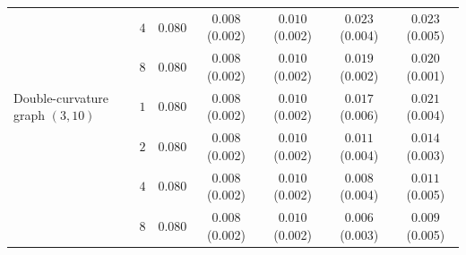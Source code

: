 \begin{tabular}{lcccccc}
 & $4$ & $0.080$ & $0.008$ \scriptsize(0.002) & $0.010$ \scriptsize(0.002) & $0.023$ \scriptsize(0.004) & $0.023$ \scriptsize(0.005) \\
 & $8$ & $0.080$ & $0.008$ \scriptsize(0.002) & $0.010$ \scriptsize(0.002) & $0.019$ \scriptsize(0.002) & $0.020$ \scriptsize(0.001) \\
\midrule
Double-curvature graph $(3,10)$ & $1$ & $0.080$ & $0.008$ \scriptsize(0.002) & $0.010$ \scriptsize(0.002) & $0.017$ \scriptsize(0.006) & $0.021$ \scriptsize(0.004) \\
 & $2$ & $0.080$ & $0.008$ \scriptsize(0.002) & $0.010$ \scriptsize(0.002) & $0.011$ \scriptsize(0.004) & $0.014$ \scriptsize(0.003) \\
 & $4$ & $0.080$ & $0.008$ \scriptsize(0.002) & $0.010$ \scriptsize(0.002) & $0.008$ \scriptsize(0.004) & $0.011$ \scriptsize(0.005) \\
 & $8$ & $0.080$ & $0.008$ \scriptsize(0.002) & $0.010$ \scriptsize(0.002) & $0.006$ \scriptsize(0.003) & $0.009$ \scriptsize(0.005) \\
\bottomrule
\end{tabular}
